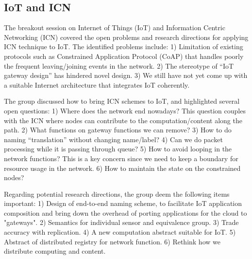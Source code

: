 \subsection{IoT and ICN}

The breakout session on Internet of Things (IoT) and Information Centric
Networking (ICN) covered the open problems and research directions for
applying ICN technique to IoT. The identified problems include: 1) Limitation
of existing protocols such as Constrained Application Protocol (CoAP) that
handles poorly the frequent leaving/joining events in the network. 2) The
stereotype of ``IoT gateway design'' has hindered novel design. 3) We still
have not yet come up with a suitable Internet architecture that integrates
IoT coherently.

The group discussed how to bring ICN schemes to IoT, and highlighted several
open questions: 1) Where does the network end nowadays? This question couples
with the ICN where nodes can contribute to the computation/content along
the path. 2) What functions on gateway functions we can remove? 3) How to do
naming ``translation'' without changing name/label? 4) Can we do packet
processing while it is passing through queue? 5) How to avoid looping in
the network functions? This is a key concern since we need to keep a
boundary for resource usage in the network. 6) How to maintain the state on
the constrained nodes?

Regarding potential research directions, the group deem the following items
important: 1) Design of end-to-end naming scheme, to facilitate IoT
application composition and bring down the overhead of porting applications
for the cloud to "gateways". 2) Semantics for individual sensor and
equivalence group. 3) Trade accuracy with replication. 4) A new computation
abstract suitable for IoT. 5) Abstract of distributed registry for network
function. 6) Rethink how we distribute computing and content.
